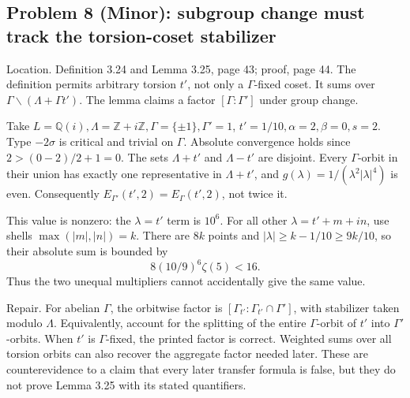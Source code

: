 \documentclass[10pt]{article}
\begin{document}
\subsection*{Problem 8 (Minor): subgroup change must track the torsion-coset stabilizer}
Location. Definition 3.24 and Lemma 3.25, page 43; proof, page 44. The definition permits arbitrary torsion \(t'\), not only a \(\Gamma\)-fixed coset. It sums over \(\Gamma\backslash(\Lambda+\Gamma t')\). The lemma claims a factor \([\Gamma:\Gamma']\) under group change.\par
Take \(L=\mathbb Q(i),\Lambda=\mathbb Z+i\mathbb Z,\Gamma=\{\pm1\},\Gamma'=1\), \(t'=1/10,\alpha=2,\beta=0,s=2\). Type \(-2\sigma\) is critical and trivial on \(\Gamma\). Absolute convergence holds since \(2>(0-2)/2+1=0\). The sets \(\Lambda+t'\) and \(\Lambda-t'\) are disjoint. Every \(\Gamma\)-orbit in their union has exactly one representative in \(\Lambda+t'\), and \(g(\lambda)=1/(\lambda^2|\lambda|^4)\) is even. Consequently \(E_{\Gamma'}(t',2)=E_\Gamma(t',2)\), not twice it.\par
This value is nonzero: the \(\lambda=t'\) term is \(10^6\). For all other \(\lambda=t'+m+in\), use shells \(\max(|m|,|n|)=k\). There are \(8k\) points and \(|\lambda|\geq k-1/10\geq9k/10\), so their absolute sum is bounded by \[8(10/9)^6\zeta(5)<16.\] Thus the two unequal multipliers cannot accidentally give the same value.\par
Repair. For abelian \(\Gamma\), the orbitwise factor is \([\Gamma_{t'}:\Gamma_{t'}\cap\Gamma']\), with stabilizer taken modulo \(\Lambda\). Equivalently, account for the splitting of the entire \(\Gamma\)-orbit of \(t'\) into \(\Gamma'\)-orbits. When \(t'\) is \(\Gamma\)-fixed, the printed factor is correct. Weighted sums over all torsion orbits can also recover the aggregate factor needed later. These are counterevidence to a claim that every later transfer formula is false, but they do not prove Lemma 3.25 with its stated quantifiers.\par
\end{document}
